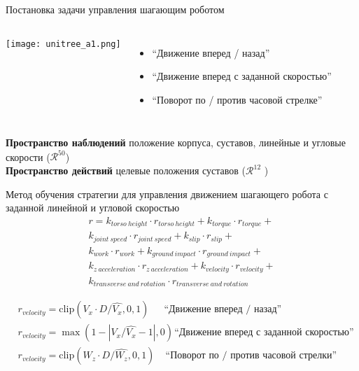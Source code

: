 \begin{frame}{Постановка задачи управления шагающим роботом}
\begin{columns}
\centering
\texttt{[image: unitree\_a1.png]}
\begin{itemize}
    \item ``Движение вперед / назад''
	\item ``Движение вперед с заданной скоростью''
    \item ``Поворот по / против часовой стрелке''
\end{itemize}
\end{columns}
\textbf{Пространство наблюдений} положение корпуса, суставов, линейные и угловые скорости ($\mathcal{R}^{50}$) 
\\
\textbf{Пространство действий} целевые положения суставов ($\mathcal{R}^{12}$ )

\end{frame}

\begin{frame}{Метод обучения стратегии для управления движением
шагающего робота с заданной линейной и угловой скоростью}
\begin{multline*}
    r = k_{torso\ height} \cdot r_{torso\ height} +
    k_{torque} \cdot r_{torque} +\\
    k_{joint\ speed} \cdot r_{joint\ speed} +
    k_{slip} \cdot r_{slip} +\\
    k_{work} \cdot r_{work} + 
    k_{ground\ impact} \cdot r_{ground\ impact} +\\
    k_{z\ acceleration} \cdot r_{z\ acceleration} +  k_{velocity} \cdot r_{velocity} +\\
    k_{transverse\ and\ rotation} \cdot r_{transverse\ and\ rotation}
\label{eq:unitree_reward}
\end{multline*}

\begin{align*}
& r_{velocity} = \mathrm{clip}(V_x \cdot D / \hat{V_x}, 0, 1) \hspace{18pt}\text{``Движение вперед / назад''}\\
& r_{velocity} = \max(1 - |V_x / \hat{V_x} - 1|, 0) \hspace{1pt}\text{``Движение вперед с заданной скоростью''}\\
& r_{velocity} = \mathrm{clip}(W_z \cdot D / \hat{W_z}, 0, 1) \hspace{13pt}\text{``Поворот по / против часовой стрелки''}
\end{align*}
\end{frame}

